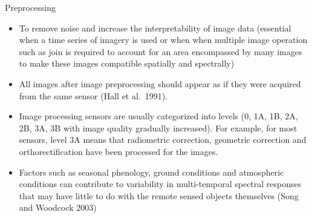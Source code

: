 \documentclass[10pt,dvipsnames,ignorenonframetext,aspectratio=169]{beamer}
\providecommand{\tightlist}{%
  \setlength{\itemsep}{0pt}\setlength{\parskip}{0pt}}
\begin{document}
\begin{frame}{Preprocessing}
\protect\hypertarget{preprocessing}{}
\begin{itemize}
\tightlist
\item
  To remove noise and increase the interpretability of image data
  (essential when a time series of imagery is used or when when multiple
  image operation such as join is required to account for an area
  encompassed by many images to make these images compatible spatially
  and spectrally)
\item
  All images after image preprocessing should appear as if they were
  acquired from the same sensor (Hall et al.~1991).
\item
  Image processing sensors are usually categorized into levels (0, 1A,
  1B, 2A, 2B, 3A, 3B with image quality gradually increased). For
  example, for most sensors, level 3A means that radiometric correction,
  geometric correction and orthorectification have been processed for
  the images.
\item
  Factors such as seasonal phenology, ground conditions and atmospheric
  conditions can contribute to variability in multi-temporal spectral
  responses that may have little to do with the remote sensed objects
  themselves (Song and Woodcock 2003)
\end{itemize}
\end{frame}
\end{document}
